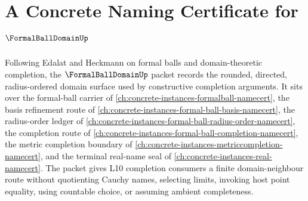 \chapter{A Concrete Naming Certificate for $\FormalBallDomainUp$}
\label{ch:concrete-instances-formal-ball-domain-namecert}

Following Edalat and Heckmann on formal balls and domain-theoretic completion, the $\FormalBallDomainUp$ packet records the rounded, directed, radius-ordered domain surface used by constructive completion arguments. It sits over the formal-ball carrier of \autoref{ch:concrete-instances-formalball-namecert}, the basis refinement route of \autoref{ch:concrete-instances-formal-ball-basis-namecert}, the radius-order ledger of \autoref{ch:concrete-instances-formal-ball-radius-order-namecert}, the completion route of \autoref{ch:concrete-instances-formal-ball-completion-namecert}, the metric completion boundary of \autoref{ch:concrete-instances-metriccompletion-namecert}, and the terminal real-name seal of \autoref{ch:concrete-instances-real-namecert}. The packet gives L10 completion consumers a finite domain-neighbour route without quotienting Cauchy names, selecting limits, invoking host point equality, using countable choice, or assuming ambient completeness.

